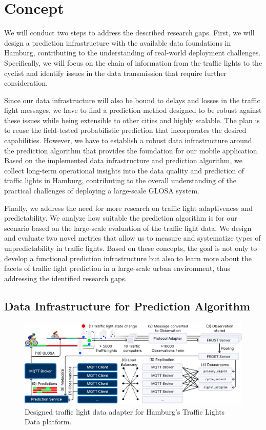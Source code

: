 \section{Concept}\label{sec:signal-prediction}

We will conduct two steps to address the described research gaps. First, we will design a prediction infrastructure with the available data foundations in Hamburg, contributing to the understanding of real-world deployment challenges. Specifically, we will focus on the chain of information from the traffic lights to the cyclist and identify issues in the data transmission that require further consideration. 

Since our data infrastructure will also be bound to delays and losses in the traffic light messages, we have to find a prediction method designed to be robust against these issues while being extensible to other cities and highly scalable. The plan is to reuse the field-tested probabilistic prediction that incorporates the desired capabilities. However, we have to establish a robust data infrastructure around the prediction algorithm that provides the foundation for our mobile application. Based on the implemented data infrastructure and prediction algorithm, we collect long-term operational insights into the data quality and prediction of traffic lights in Hamburg, contributing to the overall understanding of the practical challenges of deploying a large-scale GLOSA system.

Finally, we address the need for more research on traffic light adaptiveness and predictability. We analyze how suitable the prediction algorithm is for our scenario based on the large-scale evaluation of the traffic light data. We design and evaluate two novel metrics that allow us to measure and systematize types of unpredictability in traffic lights. Based on these concepts, the goal is not only to develop a functional prediction infrastructure but also to learn more about the facets of traffic light prediction in a large-scale urban environment, thus addressing the identified research gaps.

\subsection{Data Infrastructure for Prediction Algorithm}

\begin{figure}[t]
\centering
\includegraphics[width=\linewidth]{images/traffic-light-data-infrastructure.pdf}
\caption{Designed traffic light data adapter for Hamburg's Traffic Lights Data platform.}
\label{fig:traffic-light-data-infrastructure}
\end{figure}

